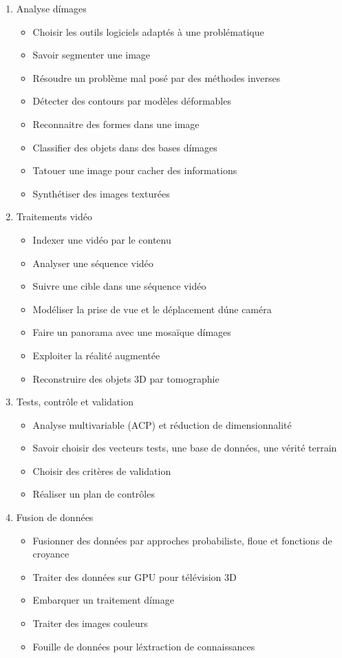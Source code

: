 {
\begin{enumerate}
\item Analyse d\'images
 \begin{itemize}
 \item Choisir les outils logiciels adaptés à une problématique
 \item Savoir segmenter une image
 \item Résoudre un problème mal posé par des méthodes inverses
 \item Détecter des contours par modèles déformables
 \item Reconnaitre des formes dans une image
 \item Classifier des objets dans des bases d\'images
 \item Tatouer une image pour cacher des informations
 \item Synthétiser des images texturées
 \end{itemize}
\item Traitements vidéo
 \begin{itemize}
 \item Indexer une vidéo par le contenu
 \item Analyser une séquence vidéo
 \item Suivre une cible dans une séquence vidéo
 \item Modéliser la prise de vue et le déplacement d\'une caméra 
 \item Faire un panorama avec une mosaïque d\'images
 \item Exploiter la réalité augmentée 
 \item Reconstruire des objets 3D par tomographie 
 \end{itemize}
\item Tests, contrôle et validation
 \begin{itemize}
 \item Analyse multivariable (ACP) et réduction de dimensionnalité
 \item Savoir choisir des vecteurs tests, une base de données, une vérité terrain
 \item Choisir des critères de validation
 \item Réaliser un plan de contrôles
 \end{itemize}
\item Fusion de données
 \begin{itemize}
 \item Fusionner des données par approches probabiliste, floue et fonctions de croyance
 \item Traiter des données sur GPU pour télévision 3D
 \item Embarquer un traitement d\'image 
 \item Traiter des images couleurs
 \item Fouille de données pour l\'extraction de connaissances
 \end{itemize}
\end{enumerate}
} 
